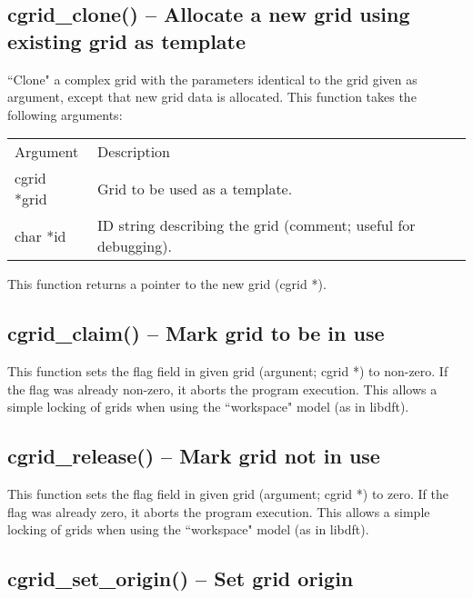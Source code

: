 \documentclass[12pt,letterpaper]{report}
\begin{document}
\subsection{cgrid\_clone() -- Allocate a new grid using existing grid as template}

``Clone" a complex grid with the parameters identical to the grid given as argument,  except that new grid data is allocated. This function takes the following arguments:
\begin{longtable}{p{} p{}}
Argument & Description\\
\cline{1-2}
cgrid *grid & Grid to be used as a template.\\
char *id & ID string describing the grid (comment; useful for debugging).\\
\end{longtable}
\noindent
This function returns a pointer to the new grid (cgrid *).

\subsection{cgrid\_claim() -- Mark grid to be in use}

This function sets the flag field in given grid (argunent; cgrid *) to non-zero. If the flag was already non-zero, it aborts the program execution. This allows a simple locking of grids when using the ``workspace" model (as in libdft).

\subsection{cgrid\_release() -- Mark grid not in use}

This function sets the flag field in given grid (argument; cgrid *) to zero. If the flag was already zero, it aborts the program execution. This allows a simple locking of grids when using the ``workspace" model (as in libdft).

\subsection{cgrid\_set\_origin() -- Set grid origin}
\end{document}
